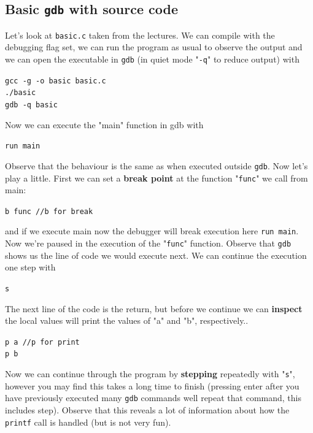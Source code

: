 \documentclass{article}
\begin{document}
\subsection{Basic \lstinline{gdb} with source code}
Let's look at \lstinline{basic.c} taken from the lectures. We can compile with the debugging  flag set, we can run the program as usual to observe the output and we can open the executable in \lstinline{gdb} (in quiet mode "\lstinline{-q}" to reduce output) with
\begin{center}
    \lstinline{gcc -g -o basic basic.c}\\
    \lstinline{./basic}\\
    \lstinline{gdb -q basic}
\end{center}
\noindent Now we can execute the "main" function in gdb with
\begin{center}
    \lstinline{run main}
\end{center}
\noindent Observe that the behaviour is the same as when executed outside \lstinline{gdb}.
Now let's play a little. First we can set a \textbf{break point} at the function
"\lstinline{func}" we call from main:
\begin{center}
    \lstinline{b func //b for break}
\end{center}
\noindent and if we execute main now the debugger will break execution here \lstinline{run main}.\\

\noindent Now we're paused in the execution of the "\lstinline{func}" function. Observe that
\lstinline{gdb} shows us the line of code we would execute next. We can continue the
execution one step with
\begin{center}
    \lstinline{s}
\end{center}
\noindent The next line of the code is the return, but before we continue we can \textbf{inspect}
the local values will print the values of "a" and "b", respectively..
\begin{center}
    \lstinline{p a //p for print}\\
    \lstinline{p b}
\end{center}
\noindent Now we can continue through the program by \textbf{stepping} repeatedly with
"\lstinline{s}", however you may find this takes a long time to finish (pressing enter
after you have previously executed many \lstinline{gdb} commands well repeat that
command, this includes step). Observe that this reveals a lot of information
about how the \lstinline{printf} call is handled (but is not very fun).\\
\end{document}
